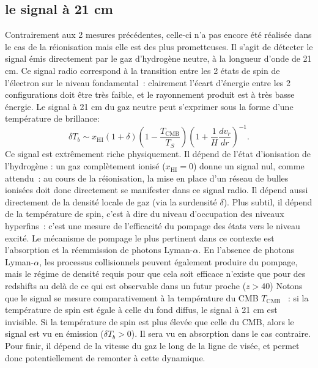 \subsection{le signal à 21 cm}
 Contrairement aux 2 mesures précédentes, celle-ci n'a pas encore été réalisée dans le cas de la réionisation mais elle est des plus prometteuses. Il s'agit de détecter le signal émis directement par le gaz d'hydrogène neutre, à la longueur d'onde de 21 cm. Ce signal radio correspond à la transition entre les 2 états de spin de l'électron sur le niveau fondamental~: clairement l'écart d'énergie entre les 2 configurations doit être très faible, et le rayonnement produit est à très basse énergie. Le signal à 21 cm du gaz neutre peut s'exprimer sous la forme d'une température de brillance:
 \begin{equation}
 \delta T_b \sim x_\mathrm{HI} (1+\delta) (1-\frac{T_\mathrm{CMB}}{T_S})(1+\frac{1}{H}\frac{d v_r}{dr})^{-1}.
 \end{equation}
 Ce signal est extrêmement riche physiquement. Il dépend de l'état d'ionisation de l'hydrogène : un gaz complètement ionisé ($x_\mathrm{HI}=0$) donne un signal nul, comme attendu~: au cours de la réionisation, la mise en place d'un réseau de bulles ionisées doit donc directement se manifester dans ce signal radio. Il dépend aussi directement de la densité locale de gaz (via la surdensité $\delta$). Plus subtil, il dépend de la température de spin, c'est à dire du niveau d'occupation des niveaux hyperfins~: c'est une mesure de l'efficacité du pompage des états vers le niveau excité. Le mécanisme de pompage le plus pertinent dans ce contexte est l'absorption et la réemmission de photons Lyman-$\alpha$.  En l'absence de photons Lyman-$\alpha$, les processus collisionnels peuvent également produire du pompage, mais le régime de densité requis pour que cela soit efficace n'existe que pour des redshifts au delà de ce qui est observable dans un futur proche ($z>40$) Notons que le signal se mesure comparativement à la température du CMB $T_\mathrm{CMB}$ ~: si la température de spin est égale à celle du fond diffus, le signal à 21 cm est invisible. Si la température de spin est plus élevée que celle du CMB, alors le signal est vu en émission ($\delta T_b >0$). Il sera vu en absorption dans le cas contraire. Pour finir, il dépend de la vitesse du gaz le long de la ligne de visée, et permet donc potentiellement de remonter à cette dynamique.

